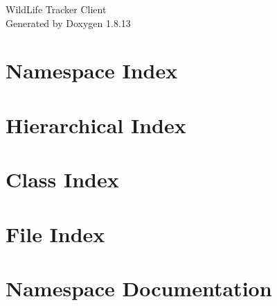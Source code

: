 \documentclass[twoside]{book}
\newcommand{\+}{\discretionary{\mbox{\scriptsize$\hookleftarrow$}}{}{}}
\newcommand{\clearemptydoublepage}{%
  \newpage{\pagestyle{empty}\cleardoublepage}%
}
\begin{document}
\hypersetup{pageanchor=false,
             bookmarksnumbered=true,
             pdfencoding=unicode
            }
\begin{titlepage}
\vspace*{7cm}
\begin{center}%
{\Large Wild\+Life Tracker Client }\\
\vspace*{1cm}
{\large Generated by Doxygen 1.8.13}\\
\end{center}
\end{titlepage}
\clearemptydoublepage
{}
\tableofcontents
\clearemptydoublepage
{}
\hypersetup{pageanchor=true}

\chapter{Namespace Index}

\chapter{Hierarchical Index}

\chapter{Class Index}

\chapter{File Index}

\chapter{Namespace Documentation}





\end{document}
